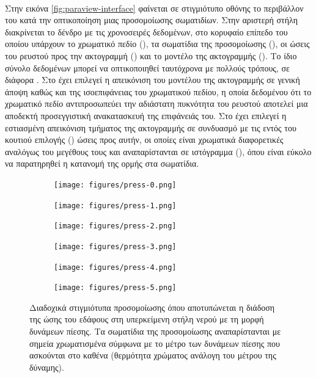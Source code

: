 \paragraph{} Στην εικόνα \ref{fig:paraview-interface} φαίνεται σε στιγμιότυπο οθόνης το
περιβάλλον του  κατά την οπτικοποίηση μιας προσομοίωσης 
σωματιδίων. Στην αριστερή στήλη διακρίνεται το δένδρο με τις χρονοσειρές δεδομένων, στο
κορυφαίο επίπεδο του οποίου υπάρχουν το χρωματικό πεδίο (), τα σωματίδια
της προσομοίωσης (), οι ώσεις του ρευστού προς την ακτογραμμή
() και το μοντέλο της ακτογραμμής (). Το ίδιο
σύνολο δεδομένων μπορεί να οπτικοποιηθεί ταυτόχρονα με πολλούς τρόπους, σε διάφορα
. Στο  έχει επιλεγεί η απεικόνιση του μοντέλου της
ακτογραμμής σε γενική άποψη καθώς και της ισοεπιφάνειας του χρωματικού πεδίου, η οποία
δεδομένου ότι το χρωματικό πεδίο αντιπροσωπεύει την αδιάστατη πυκνότητα του ρευστού
αποτελεί μια αποδεκτή προσεγγιστική ανακατασκευή της επιφάνειάς του. Στο 
έχει επιλεγεί η εστιασμένη απεικόνιση τμήματος της ακτογραμμής σε συνδυασμό με τις εντός
του κουτιού επιλογής () ώσεις προς αυτήν, οι οποίες είναι χρωματικά διαφορετικές
αναλόγως του μεγέθους τους και αναπαρίστανται σε ιστόγραμμα (), όπου
είναι εύκολο να παρατηρηθεί η κατανομή της ορμής στα σωματίδια.

\begin{figure}[]
  \begin{subfigure}{.5\textwidth}
    \centering
    \texttt{[image: figures/press-0.png]}
  \end{subfigure}
  \begin{subfigure}{.5\textwidth}
    \centering
    \texttt{[image: figures/press-1.png]}
  \end{subfigure}
  \begin{subfigure}{.5\textwidth}
    \centering
    \texttt{[image: figures/press-2.png]}
  \end{subfigure}
  \begin{subfigure}{.5\textwidth}
    \centering
    \texttt{[image: figures/press-3.png]}
  \end{subfigure}
  \begin{subfigure}{.5\textwidth}
    \centering
    \texttt{[image: figures/press-4.png]}
  \end{subfigure}
  \begin{subfigure}{.5\textwidth}
    \centering
    \texttt{[image: figures/press-5.png]}
  \end{subfigure}
  \caption[Διάδοση δυνάμεων πίεσης]{Διαδοχικά στιγμιότυπα προσομοίωσης όπου αποτυπώνεται η
    διάδοση της ώσης του εδάφους στη υπερκείμενη στήλη νερού με τη μορφή δυνάμεων
    πίεσης. Τα σωματίδια της προσομοίωσης αναπαρίστανται με σημεία χρωματισμένα σύμφωνα με
    το μέτρο των δυνάμεων πίεσης που ασκούνται στο καθένα (θερμότητα χρώματος ανάλογη του
    μέτρου της δύναμης).}
  \label{fig:pressure-forces}
\end{figure}

